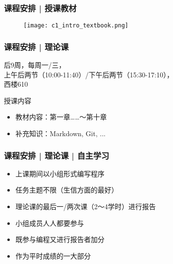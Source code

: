 \begin{frame}
  \frametitle{课程安排 | 授课教材}
  \begin{figure}
    \centering
    \texttt{[image: c1\_intro\_textbook.png]}
  \end{figure}
\end{frame}

\begin{frame}
  \frametitle{课程安排 | 理论课}
  \begin{center}
  \alert{后9周，每周一/三，\\ 上午后两节（10:00-11:40）/下午后两节（15:30-17:10），\\ 西楼610}\\
  \vspace{0.2cm}
  \end{center}
  \begin{block}{授课内容}
    \begin{itemize}
      \item 教材内容：第一章……～第十章
      \item 补充知识：Markdown, Git, ...
    \end{itemize}
  \end{block}
\end{frame}

\begin{frame}
  \frametitle{课程安排 | 理论课 | 自主学习}
  \begin{itemize}
    \item 上课期间以小组形式编写程序
    \item 任务主题不限（生信方面的最好）
    \item 理论课的最后一/两次课（2～4学时）进行报告
    \item 小组成员人人都要参与
    \item 既参与编程又进行报告者加分
    \item 作为平时成绩的一大部分
  \end{itemize}
\end{frame}

